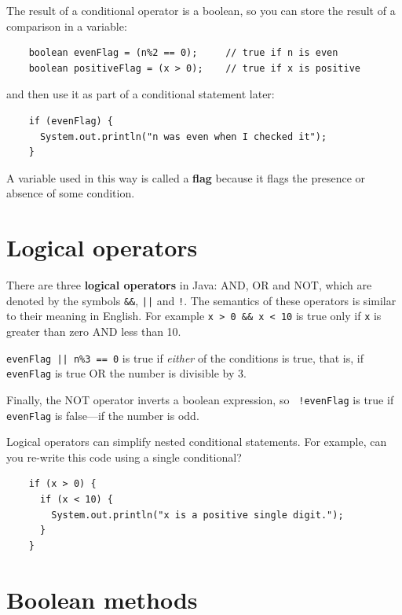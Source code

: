 
The result of a conditional operator is a boolean,
so you can store the result of a comparison in a variable:

\begin{lstlisting}
    boolean evenFlag = (n%2 == 0);     // true if n is even
    boolean positiveFlag = (x > 0);    // true if x is positive
\end{lstlisting}
%
and then use it as part of a conditional statement later:

\begin{lstlisting}
    if (evenFlag) {
      System.out.println("n was even when I checked it");
    }
\end{lstlisting}
%
A variable used in this way is called a {\bf flag}
because it flags the presence or absence of some condition.


\section{Logical operators}

There are three {\bf logical operators} in Java: AND, OR and NOT,
which are denoted by the symbols {\tt \&\&}, {\tt ||} and
{\tt !}.  The semantics of these operators is similar
to their meaning in English.  For example {\tt x > 0 \&\& x < 10}
is true only if {\tt x} is greater than zero AND less than 10.

{\tt evenFlag || n\%3 == 0} is true if {\em either} of
the conditions is true, that is, if {\tt evenFlag} is true OR the
number is divisible by 3.

Finally, the NOT operator inverts a boolean expression, so {\tt
  !evenFlag} is true if {\tt evenFlag} is false---if the number is
odd.


Logical operators can simplify nested
conditional statements.  For example, can you re-write
this code using a single conditional?

\begin{lstlisting}
    if (x > 0) {
      if (x < 10) {
        System.out.println("x is a positive single digit.");
      }
    }
\end{lstlisting}


\section{Boolean methods}
\label{boolean}


